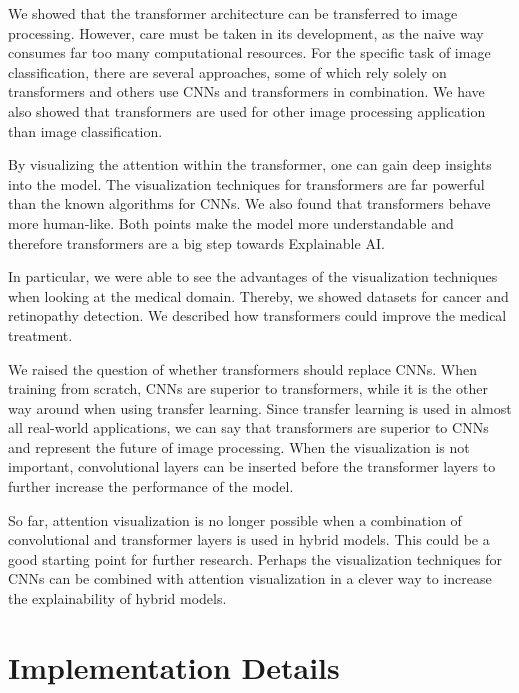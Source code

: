 \documentclass[a4paper]{scrartcl}
\let\stdsection\section
\renewcommand\section{\newpage\stdsection}
\begin{document}
    We showed that the transformer architecture can be transferred to image processing.
    However, care must be taken in its development, as the naive way consumes far too many computational resources.
    For the specific task of image classification, there are several approaches, some of which rely solely on transformers and others use CNNs and transformers in combination.
    We have also showed that transformers are used for other image processing application than image classification.

    By visualizing the attention within the transformer, one can gain deep insights into the model.
    The visualization techniques for transformers are far powerful than the known algorithms for CNNs.
    We also found that transformers behave more human-like.
    Both points make the model more understandable and therefore transformers are a big step towards Explainable AI\@.

    In particular, we were able to see the advantages of the visualization techniques when looking at the medical domain.
    Thereby, we showed datasets for cancer and retinopathy detection.
    We described how transformers could improve the medical treatment.

    We raised the question of whether transformers should replace CNNs.
    When training from scratch, CNNs are superior to transformers, while it is the other way around when using transfer learning.
    Since transfer learning is used in almost all real-world applications, we can say that transformers are superior to CNNs and represent the future of image processing.
    When the visualization is not important, convolutional layers can be inserted before the transformer layers to further increase the performance of the model.

    So far, attention visualization is no longer possible when a combination of convolutional and transformer layers is used in hybrid models.
    This could be a good starting point for further research.
    Perhaps the visualization techniques for CNNs can be combined with attention visualization in a clever way to increase the explainability of hybrid models.



    \pagebreak
    \appendix


    \section{Implementation Details}\label{sec:implementation-details}
\end{document}
